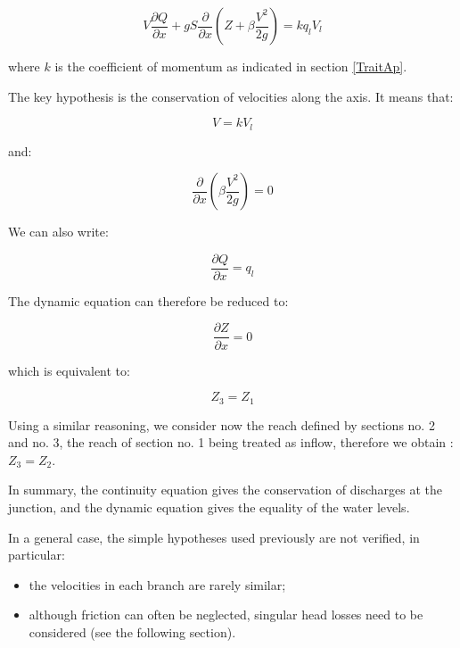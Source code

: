 \begin{equation}
  V \frac{\partial Q}{\partial x} + g S \frac{\partial}{\partial x} \left ( Z + \beta \frac{V^2}{2 g} \right ) = k q_l V_l
\end{equation}

where $k$ is the coefficient of momentum as indicated in section \ref{TraitAp}.

The key hypothesis is the conservation of velocities along the axis. It means that:

\begin{equation}
  V = k V_l
\end{equation}

and:

\begin{equation}
  \frac{\partial}{\partial x} \left ( \beta \frac{V^2}{2g} \right ) = 0
\end{equation}

We can also write:

\begin{equation}
  \frac{\partial Q}{\partial x} = q_l
\end{equation}

The dynamic equation can therefore be reduced to:

\begin{equation}
  \frac{\partial Z}{\partial x} = 0
\end{equation}

which is equivalent to:

\begin{equation}
  Z_3 = Z_1
\end{equation}

Using a similar reasoning, we consider now the reach defined by sections no. 2 and no. 3, the reach of section no. 1 being treated as inflow, therefore we obtain : $Z_3 = Z_2$.

In summary, the continuity equation gives the conservation of discharges at the junction, and the dynamic equation gives the equality of the water levels.

In a general case, the simple hypotheses used previously are not verified, in particular:
\begin{itemize}
 \item the velocities in each branch are rarely similar;
 \item although friction can often be neglected, singular head losses need to be considered (see the following section).
\end{itemize}

